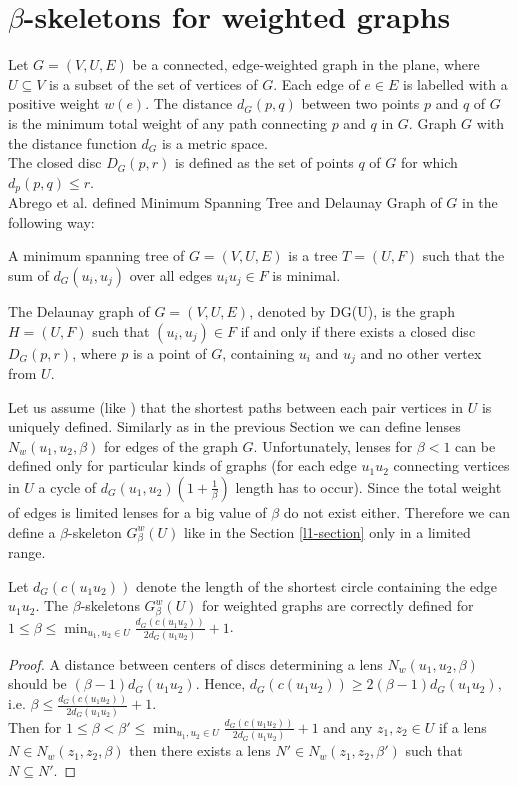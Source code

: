 \documentclass[11pt]{llncs}
\begin{document}
\section{$\beta$-skeletons for weighted graphs}

Let $G=(V,U,E)$ be a connected, edge-weighted graph in the plane, where $U \subseteq V$ 
is a subset of the set of vertices of $G$. Each edge of $e \in E$ is labelled with 
a positive weight $w(e)$. 
The distance $d_G(p,q)$ between two points $p$ and $q$ of $G$ is the minimum total weight 
of any path connecting $p$ and $q$ in $G$.
Graph $G$ with the distance function $d_G$ is a metric space.\\
The closed disc $D_G(p,r)$ is defined as the set of points $q$ of $G$ for which $d_p(p,q) \leq r$.\\

Abrego et al. \cite{a12} defined Minimum Spanning Tree and Delaunay Graph of $G$ 
in the following way:

\begin{definition}
A minimum spanning tree of $G=(V,U,E)$ is a tree $T=(U,F)$ such that the sum of $d_G(u_i,u_j)$ 
over all edges $u_iu_j \in F$ is minimal. 

The Delaunay graph of $G=(V,U,E)$, denoted by DG(U), is the graph $H=(U,F)$ such that 
$(u_i,u_j) \in F$ if and only if there exists a closed disc $D_G(p,r)$, where $p$ is a 
point of $G$, containing $u_i$ and $u_j$ and no other vertex from $U$.

\end{definition}


Let us assume (like \cite{a12}) that the shortest paths between each pair vertices in $U$ is uniquely 
defined. Similarly as in the previous Section we can define lenses $N_w(u_1,u_2,\beta)$ for edges 
of the graph $G$.
Unfortunately, lenses for $\beta < 1$ can be defined only for particular kinds of graphs
(for each edge $u_1u_2$ connecting vertices in $U$ a cycle of $d_G(u_1,u_2)(1+\frac{1}{\beta})$ 
length has to occur). Since the total weight of edges is limited lenses for a big value 
of $\beta$ do not exist either. Therefore we can define a $\beta$-skeleton $G_{\beta}^w(U)$
like in the Section \ref{l1-section} only in a limited range.

\begin{lemma}
\label{beta-weight}
Let $d_G(c(u_1u_2))$ denote the length of the shortest circle containing the edge $u_1u_2$.
The $\beta$-skeletons $G_{\beta}^w(U)$ for weighted graphs are correctly defined 
for $1 \leq \beta \leq \min_{u_1,u_2 \in U} \frac{d_G(c(u_1u_2))}{2d_G(u_1u_2)}+1$.
\end{lemma}   
\begin{proof}
A distance between centers of discs determining a lens $N_w(u_1,u_2,\beta)$ should be
$(\beta-1)d_G(u_1u_2)$. Hence, $d_G(c(u_1u_2)) \geq 2(\beta-1)d_G(u_1u_2)$, i.e.
$\beta \leq \frac{d_G(c(u_1u_2))}{2d_G(u_1u_2)}+1$. \\
Then for $1 \leq \beta < \beta' \leq \min_{u_1,u_2 \in U} \frac{d_G(c(u_1u_2))}{2d_G(u_1u_2)}+1$
and any $z_1,z_2 \in U$ if a lens $N \in N_w(z_1,z_2,\beta)$ then there exists
a lens $N' \in N_w(z_1,z_2,\beta')$ such that $N \subseteq N'$. 
\end{proof}
\end{document}
